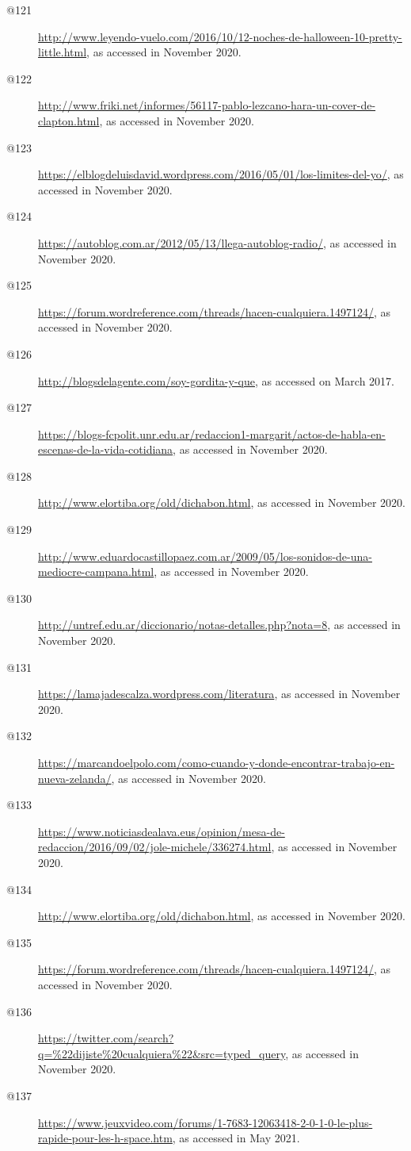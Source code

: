 \begin{flushleft}
\begin{description}
\item[@121] \url{http://www.leyendo-vuelo.com/2016/10/12-noches-de-halloween-10-pretty-little.html}, as accessed in November 2020.
\item[@122] \url{http://www.friki.net/informes/56117-pablo-lezcano-hara-un-cover-de-clapton.html}, as accessed in November 2020.
\item[@123] \url{https://elblogdeluisdavid.wordpress.com/2016/05/01/los-limites-del-yo/}, as accessed in November 2020.
\item[@124] \url{https://autoblog.com.ar/2012/05/13/llega-autoblog-radio/}, as accessed in November 2020.
\item[@125] \url{https://forum.wordreference.com/threads/hacen-cualquiera.1497124/}, as accessed in November 2020.
\item[@126] \url{http://blogsdelagente.com/soy-gordita-y-que}, as accessed on March 2017.
\item[@127] \url{https://blogs-fcpolit.unr.edu.ar/redaccion1-margarit/actos-de-habla-en-escenas-de-la-vida-cotidiana}, as accessed in November 2020.
\item[@128] \url{http://www.elortiba.org/old/dichabon.html}, as accessed in November 2020.
\item[@129] \url{http://www.eduardocastillopaez.com.ar/2009/05/los-sonidos-de-una-mediocre-campana.html}, as accessed in November 2020.
\item[@130] \url{http://untref.edu.ar/diccionario/notas-detalles.php?nota=8}, as accessed in November 2020.
\item[@131] \url{https://lamajadescalza.wordpress.com/literatura}, as accessed in November 2020.
\item[@132] \url{https://marcandoelpolo.com/como-cuando-y-donde-encontrar-trabajo-en-nueva-zelanda/}, as accessed in November 2020.
\item[@133] \url{https://www.noticiasdealava.eus/opinion/mesa-de-redaccion/2016/09/02/jole-michele/336274.html}, as accessed in November 2020.
\item[@134] \url{http://www.elortiba.org/old/dichabon.html}, as accessed in November 2020.
\item[@135] \url{https://forum.wordreference.com/threads/hacen-cualquiera.1497124/}, as accessed in November 2020.
\item[@136] \url{https://twitter.com/search?q=\%22dijiste\%20cualquiera\%22&src=typed_query}, as accessed in November 2020.
\item[@137] \url{https://www.jeuxvideo.com/forums/1-7683-12063418-2-0-1-0-le-plus-rapide-pour-les-h-space.htm}, as accessed in May 2021.

\end{description}
\end{flushleft}
